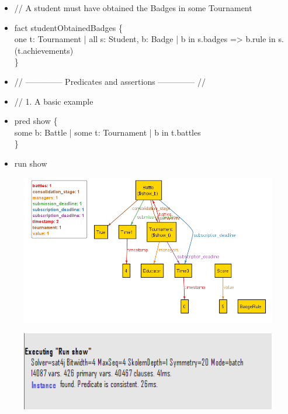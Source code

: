 \documentclass{Configuration_Files/Template}
\begin{document}
\begin{itemize}
\item // A student must have obtained the Badges in some Tournament
\item fact studentObtainedBadges \{\\
one t: Tournament | all s: Student, b: Badge | b in s.badges => b.rule in s.(t.achievements)\\
\}\\
\end{itemize}

\begin{itemize}
\item // -------------- Predicates and assertions -------------- //\\
\end{itemize}

\begin{itemize}
\item //  1. A basic example
\item pred show \{\\
some b: Battle | some t: Tournament | b in t.battles\\
\}
\item run show
\end{itemize}
\begin{figure}[H]
\includegraphics[scale = 0.7]{Images/Alloy/1Model.png}\\
\centering
\end{figure}
\begin{figure}[H]
\includegraphics[scale = 0.7]{Images/Alloy/1Outcome.png}\\
\centering
\end{figure}
\end{document}
